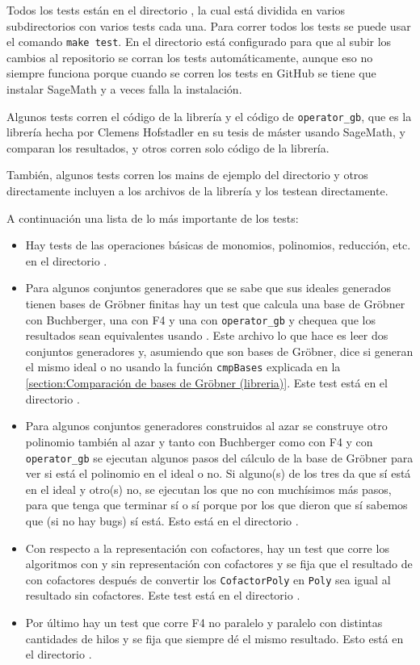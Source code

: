 \documentclass[12pt]{report}
\theoremstyle{customstyle}
\theoremstyle{factstyle}
\begin{document}
Todos los tests están en el directorio , la cual está dividida en varios subdirectorios con varios tests cada una. Para correr todos los tests se puede usar el comando \texttt{make test}. En el directorio  está configurado para que al subir los cambios al repositorio se corran los tests automáticamente, aunque eso no siempre funciona porque cuando se corren los tests en GitHub se tiene que instalar SageMath y a veces falla la instalación.

Algunos tests corren el código de la librería y el código de \texttt{operator\_gb}, que es la librería hecha por Clemens Hofstadler en su tesis de máster \cite{thesis:Hof20} usando SageMath, y comparan los resultados, y otros corren solo código de la librería.

También, algunos tests corren los mains de ejemplo del directorio  y otros directamente incluyen a los archivos de la librería y los testean directamente.

A continuación una lista de lo más importante de los tests:

\begin{itemize}
  \item Hay tests de las operaciones básicas de monomios, polinomios, reducción, etc. en el directorio .
  \item Para algunos conjuntos generadores que se sabe que sus ideales generados tienen bases de Gröbner finitas hay un test que calcula una base de Gröbner con Buchberger, una con F4 y una con \texttt{operator\_gb} y chequea que los resultados sean equivalentes usando . Este archivo lo que hace es leer dos conjuntos generadores y, asumiendo que son bases de Gröbner, dice si generan el mismo ideal o no usando la función \texttt{cmpBases} explicada en la \cref{section:Comparación de bases de Gröbner (libreria)}. Este test está en el directorio .
  \item Para algunos conjuntos generadores construidos al azar se construye otro polinomio también al azar y tanto con Buchberger como con F4 y con \texttt{operator\_gb} se ejecutan algunos pasos del cálculo de la base de Gröbner para ver si está el polinomio en el ideal o no. Si alguno(s) de los tres da que sí está en el ideal y otro(s) no, se ejecutan los que no con muchísimos más pasos, para que tenga que terminar sí o sí porque por los que dieron que sí sabemos que (si no hay bugs) sí está. Esto está en el directorio . %
  \item Con respecto a la representación con cofactores, hay un test que corre los algoritmos con y sin representación con cofactores y se fija que el resultado de con cofactores después de convertir los \texttt{CofactorPoly} en \texttt{Poly} sea igual al resultado sin cofactores. Este test está en el directorio .
  \item Por último hay un test que corre F4 no paralelo y paralelo con distintas cantidades de hilos y se fija que siempre dé el mismo resultado. Esto está en el directorio .
\end{itemize}
\end{document}
